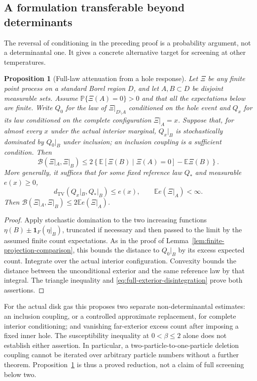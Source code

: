 \documentclass[11pt]{article}
\newtheorem{proposition}[theorem]{Proposition}
\theoremstyle{remark}\newtheorem{remark}[theorem]{Remark}
\begin{document}
\subsection{A formulation transferable beyond determinants}

The reversal of conditioning in the preceding proof is a probability
argument, not a determinantal one.  It gives a concrete alternative
target for screening at other temperatures.

\begin{proposition}[Full-law attenuation from a hole response]
\label{prop:general-hole-response}
Let $\Xi$ be any finite point process on a standard Borel region $D$,
and let $A,B\subset D$ be disjoint measurable sets.  Assume
$\mathbb P\{\Xi(A)=0\}>0$ and that all the expectations below are finite.
Write $Q_0$ for the law of $\Xi|_{D\setminus A}$ conditioned on the
hole event and $Q_x$ for its law conditioned on the complete
configuration $\Xi|_A=x$.  Suppose that, for almost every $x$ under the
actual interior marginal, $Q_x|_B$ is stochastically dominated by
$Q_0|_B$ under inclusion; an inclusion coupling is a sufficient
condition.
Then
\begin{equation}\label{eq:general-hole-response}
 \mathcal B(\Xi|_A,\Xi|_B)
 \le2\left\{
  \mathbb E[\Xi(B)\mid\Xi(A)=0]-\mathbb E\Xi(B)\right\}.
\end{equation}
More generally, it suffices that for some fixed reference law $Q_*$
and measurable $e(x)\ge0$,
\[
 d_{\mathrm{TV}}(Q_x|_B,Q_*|_B)\le e(x),
 \qquad \mathbb E e(\Xi|_A)<\infty.
\]
Then $\mathcal B(\Xi|_A,\Xi|_B)\le2\mathbb E e(\Xi|_A)$.
\end{proposition}
\begin{proof}
Apply stochastic domination to the two increasing functions
$\eta(B)\pm\mathbf1_F(\eta|_B)$, truncated if necessary and
then passed to the limit by the assumed finite count expectations.
As in the proof of Lemma~\ref{lem:finite-projection-comparison}, this
bounds the distance to $Q_0|_B$ by its excess expected count.  Integrate over the actual
interior configuration.  Convexity bounds the distance between the
unconditional exterior and the same reference law by that integral.
The triangle inequality and
\eqref{eq:full-exterior-disintegration} prove both assertions.
\end{proof}

For the actual disk gas this proposes two separate non-determinantal
estimates: an inclusion coupling, or a controlled approximate
replacement, for complete interior conditioning; and vanishing
far-exterior excess count after imposing a fixed inner hole.  The
susceptibility inequality at $0<\beta\le2$ alone does not establish
either assertion.  In particular, a two-particle-to-one-particle
deletion coupling cannot be iterated over arbitrary particle numbers
without a further theorem.  Proposition~\ref{prop:general-hole-response}
is thus a proved reduction, not a claim of full screening below two.
\end{document}
